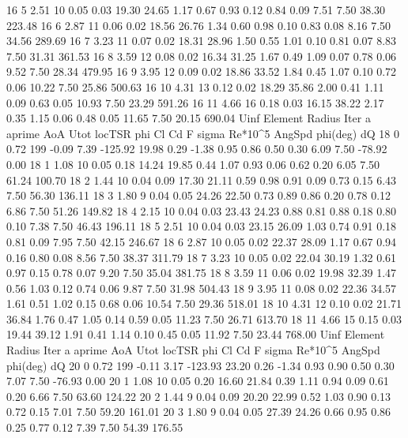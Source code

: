 \begin{pythoncode}
16  5  2.51  10  0.05  0.03  19.30  24.65  1.17  0.67  0.93  0.12  0.84  0.09  7.51  7.50  38.30  223.48
16  6  2.87  11  0.06  0.02  18.56  26.76  1.34  0.60  0.98  0.10  0.83  0.08  8.16  7.50  34.56  289.69
16  7  3.23  11  0.07  0.02  18.31  28.96  1.50  0.55  1.01  0.10  0.81  0.07  8.83  7.50  31.31  361.53
16  8  3.59  12  0.08  0.02  16.34  31.25  1.67  0.49  1.09  0.07  0.78  0.06  9.52  7.50  28.34  479.95
16  9  3.95  12  0.09  0.02  18.86  33.52  1.84  0.45  1.07  0.10  0.72  0.06  10.22  7.50  25.86  500.63
16  10  4.31  13  0.12  0.02  18.29  35.86  2.00  0.41  1.11  0.09  0.63  0.05  10.93  7.50  23.29  591.26
16  11  4.66  16  0.18  0.03  16.15  38.22  2.17  0.35  1.15  0.06  0.48  0.05  11.65  7.50  20.15  690.04
Uinf  Element  Radius  Iter  a  aprime  AoA  Utot  locTSR  phi  Cl  Cd  F  sigma  Re*10^5  AngSpd  phi(deg)  dQ
18  0  0.72  199  -0.09  7.39  -125.92  19.98  0.29  -1.38  0.95  0.86  0.50  0.30  6.09  7.50  -78.92  0.00
18  1  1.08  10  0.05  0.18  14.24  19.85  0.44  1.07  0.93  0.06  0.62  0.20  6.05  7.50  61.24  100.70
18  2  1.44  10  0.04  0.09  17.30  21.11  0.59  0.98  0.91  0.09  0.73  0.15  6.43  7.50  56.30  136.11
18  3  1.80  9  0.04  0.05  24.26  22.50  0.73  0.89  0.86  0.20  0.78  0.12  6.86  7.50  51.26  149.82
18  4  2.15  10  0.04  0.03  23.43  24.23  0.88  0.81  0.88  0.18  0.80  0.10  7.38  7.50  46.43  196.11
18  5  2.51  10  0.04  0.03  23.15  26.09  1.03  0.74  0.91  0.18  0.81  0.09  7.95  7.50  42.15  246.67
18  6  2.87  10  0.05  0.02  22.37  28.09  1.17  0.67  0.94  0.16  0.80  0.08  8.56  7.50  38.37  311.79
18  7  3.23  10  0.05  0.02  22.04  30.19  1.32  0.61  0.97  0.15  0.78  0.07  9.20  7.50  35.04  381.75
18  8  3.59  11  0.06  0.02  19.98  32.39  1.47  0.56  1.03  0.12  0.74  0.06  9.87  7.50  31.98  504.43
18  9  3.95  11  0.08  0.02  22.36  34.57  1.61  0.51  1.02  0.15  0.68  0.06  10.54  7.50  29.36  518.01
18  10  4.31  12  0.10  0.02  21.71  36.84  1.76  0.47  1.05  0.14  0.59  0.05  11.23  7.50  26.71  613.70
18  11  4.66  15  0.15  0.03  19.44  39.12  1.91  0.41  1.14  0.10  0.45  0.05  11.92  7.50  23.44  768.00
Uinf  Element  Radius  Iter  a  aprime  AoA  Utot  locTSR  phi  Cl  Cd  F  sigma  Re*10^5  AngSpd  phi(deg)  dQ
20  0  0.72  199  -0.11  3.17  -123.93  23.20  0.26  -1.34  0.93  0.90  0.50  0.30  7.07  7.50  -76.93  0.00
20  1  1.08  10  0.05  0.20  16.60  21.84  0.39  1.11  0.94  0.09  0.61  0.20  6.66  7.50  63.60  124.22
20  2  1.44  9  0.04  0.09  20.20  22.99  0.52  1.03  0.90  0.13  0.72  0.15  7.01  7.50  59.20  161.01
20  3  1.80  9  0.04  0.05  27.39  24.26  0.66  0.95  0.86  0.25  0.77  0.12  7.39  7.50  54.39  176.55

\end{pythoncode}
